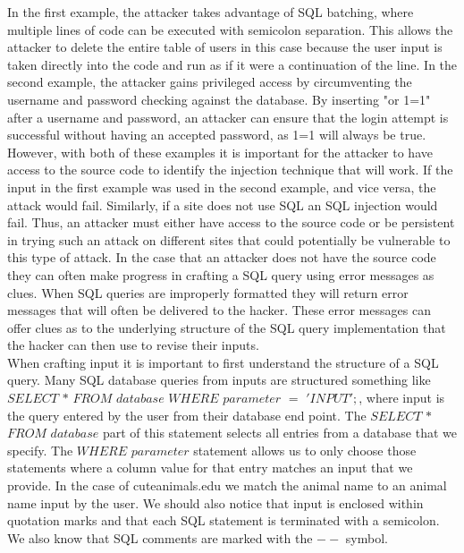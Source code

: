 \documentclass[11pt]{article}
\begin{document}
In the first example, the attacker takes advantage of SQL batching, where multiple lines of code can be executed with semicolon separation. This allows the attacker to delete the entire table of users in this case because the user input is taken directly into the code and run as if it were a continuation of the line. In the second example, the attacker gains privileged access by circumventing the username and password checking against the database. By inserting "or 1=1" after a username and password, an attacker can ensure that the login attempt is successful without having an accepted password, as 1=1 will always be true.\\

However, with both of these examples it is important for the attacker to have access to the source code to identify the injection technique that will work. If the input in the first example was used in the second example, and vice versa, the attack would fail. Similarly, if a site does not use SQL an SQL injection would fail. Thus, an attacker must either have access to the source code or be persistent in trying such an attack on different sites that could potentially be vulnerable to this type of attack. In the case that an attacker does not have the source code they can often make progress in crafting a SQL query using error messages as clues. When SQL queries are improperly formatted they will return error messages that will often be delivered to the hacker. These error messages can offer clues as to the underlying structure of the SQL query implementation that the hacker can then use to revise their inputs.\\

When crafting input it is important to first understand the structure of a SQL query. Many SQL database queries from inputs are structured something like 
$SELECT$ $*$ $FROM$ $database$ $WHERE$ $parameter$ $=$ $'INPUT';$, where input is the query entered by the user from their database end point. The $SELECT$ $*$ $FROM$ $database$ part of this statement selects all entries from a database that we specify. The $WHERE$ $parameter$ statement allows us to only choose those statements where a column value for that entry matches an input that we provide. In the case of cuteanimals.edu we match the animal name to an animal name input by the user. We should also notice that input is enclosed within quotation marks and that each SQL statement is terminated with a semicolon. We also know that SQL comments are marked with the $--$ symbol.  \\
\end{document}

